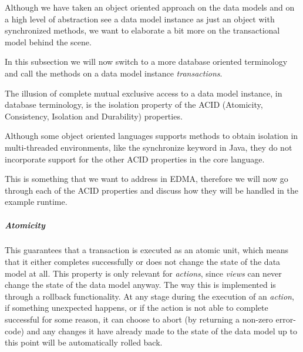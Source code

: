Although we have taken an object oriented approach on the data models
and on a high level of abstraction see a data model instance as just
an object with synchronized methods, we want to elaborate a bit more
on the transactional model behind the scene.

In this subsection we will now switch to a more database oriented
terminology and call the methods on a data model instance \emph{transactions}.

The illusion of complete mutual exclusive access to a data model instance,
in database terminology, is the isolation property of the ACID (Atomicity,
Consistency, Isolation and Durability) properties.

Although some object oriented languages supports methods to obtain
isolation in multi-threaded environments, like the synchronize keyword
in Java, they do not incorporate support for the other ACID properties
in the core language.

This is something that we want to address in EDMA, therefore we will
now go through each of the ACID properties and discuss how they will
be handled in the example runtime. 


\subparagraph{Atomicity}

This guarantees that a transaction is executed as an atomic unit,
which means that it either completes successfully or does not change
the state of the data model at all. This property is only relevant
for \emph{actions}, since \emph{views} can never change the state
of the data model anyway. The way this is implemented is through a
rollback functionality. At any stage during the execution of an \emph{action},
if something unexpected happens, or if the action is not able to complete
successful for some reason, it can choose to abort (by returning a
non-zero error-code) and any changes it have already made to the state
of the data model up to this point will be automatically rolled back.

